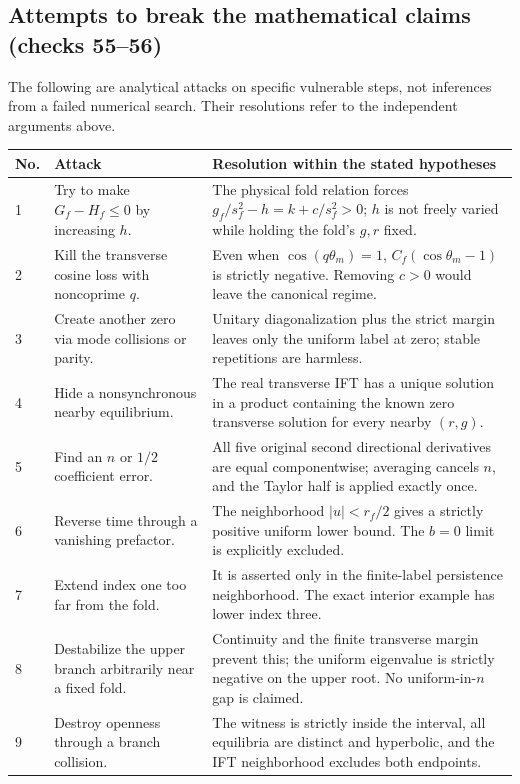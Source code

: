\documentclass[11pt]{article}
\begin{document}
\subsection{Attempts to break the mathematical claims (checks 55--56)}
The following are analytical attacks on specific vulnerable steps, not
inferences from a failed numerical search. Their resolutions refer to the
independent arguments above.
\small
\begin{longtable}{@{}p{}>{\raggedright\arraybackslash}p{}>{\raggedright\arraybackslash}p{}@{}}
\toprule No.&Attack&Resolution within the stated hypotheses\\\midrule\endhead
1&Try to make $G_f-H_f\le0$ by increasing $h$.&The physical fold relation forces $g_f/s_f^2-h=k+c/s_f^2>0$; $h$ is not freely varied while holding the fold's $g,r$ fixed.\\
2&Kill the transverse cosine loss with noncoprime $q$.&Even when $\cos(q\theta_m)=1$, $C_f(\cos\theta_m-1)$ is strictly negative. Removing $c>0$ would leave the canonical regime.\\
3&Create another zero via mode collisions or parity.&Unitary diagonalization plus the strict margin leaves only the uniform label at zero; stable repetitions are harmless.\\
4&Hide a nonsynchronous nearby equilibrium.&The real transverse IFT has a unique solution in a product containing the known zero transverse solution for every nearby $(r,g)$.\\
5&Find an $n$ or $1/2$ coefficient error.&All five original second directional derivatives are equal componentwise; averaging cancels $n$, and the Taylor half is applied exactly once.\\
6&Reverse time through a vanishing prefactor.&The neighborhood $|u|<r_f/2$ gives a strictly positive uniform lower bound. The $b=0$ limit is explicitly excluded.\\
7&Extend index one too far from the fold.&It is asserted only in the finite-label persistence neighborhood. The exact interior example has lower index three.\\
8&Destabilize the upper branch arbitrarily near a fixed fold.&Continuity and the finite transverse margin prevent this; the uniform eigenvalue is strictly negative on the upper root. No uniform-in-$n$ gap is claimed.\\
9&Destroy openness through a branch collision.&The witness is strictly inside the interval, all equilibria are distinct and hyperbolic, and the IFT neighborhood excludes both endpoints.\\

\end{longtable}
\end{document}
